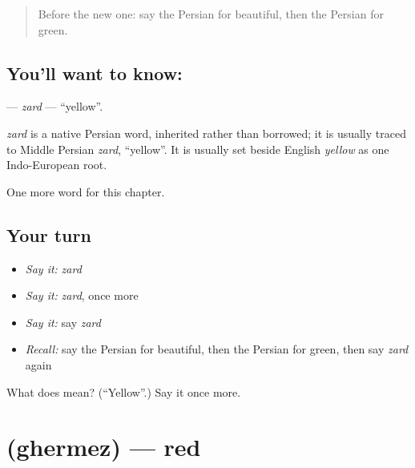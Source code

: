 \label{lesson:FA-C63-zard}



\begin{quote}
Before the new one: say the Persian for beautiful, then the Persian for green.
\end{quote}

\subsection*{You'll want to know: }
\textbf{} — \emph{zard} — \textquotedblleft{}yellow\textquotedblright{}.

\begin{cousinweb}
\emph{zard} is a native Persian word, inherited rather than borrowed; it is usually traced to Middle Persian \emph{zard}, \textquotedblleft{}yellow\textquotedblright{}. It is usually set beside English \emph{yellow} as one Indo-European root.
\end{cousinweb}

\begin{grammarlens}[title={What you've built}]
One more word for this chapter.
\end{grammarlens}

\subsection*{Your turn}
\begin{itemize}
\raggedright
  \item \emph{Say it:} \emph{zard}
  \item \emph{Say it:} \emph{zard}, once more
  \item \emph{Say it:} say \emph{zard}
  \item \emph{Recall:} say the Persian for beautiful, then the Persian for green, then say \emph{zard} again
\end{itemize}

\begin{tcolorbox}[breakable,colback=teal!4,colframe=teal!35!black,title={Before you move on}]
What does  mean? (\textquotedblleft{}Yellow\textquotedblright{}.) Say it once more.
\end{tcolorbox}
\section[\texorpdfstring{\fa{قرمز} (ghermez)}{قرمز (ghermez)}]{ (ghermez) — red}

\label{lesson:FA-C63-ghermez}



